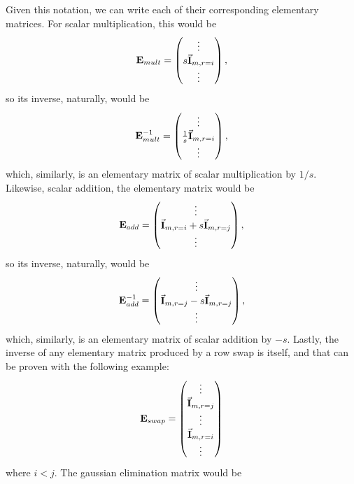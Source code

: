 \documentclass[12pt]{article}
\newcommand{\mat}[1]{\mathbf{#1}}
\begin{document}
Given this notation, we can write each of their corresponding elementary matrices. For scalar multiplication, this would be
\begin{equation*}
\mat{E}_{mult} = \begin{pmatrix}
  \vdots \\
  s\va{I}_{m,r=i}\\
  \vdots
\end{pmatrix},
\end{equation*}
so its inverse, naturally, would be
\begin{equation*}
\mat{E}_{mult}^{-1} = \begin{pmatrix}
  \vdots \\
  \frac{1}{s}\va{I}_{m,r=i}\\
  \vdots
\end{pmatrix},
\end{equation*}
which, similarly, is an elementary matrix of scalar multiplication by $1/s$. Likewise, scalar addition, the elementary matrix would be
\begin{equation*}
\mat{E}_{add} = \begin{pmatrix}
  \vdots \\
  \va{I}_{m,r=i} + s\va{I}_{m,r=j} \\
  \vdots
\end{pmatrix},
\end{equation*}
so its inverse, naturally, would be
\begin{equation*}
\mat{E}_{add}^{-1} = \begin{pmatrix}
  \vdots \\
  \va{I}_{m,r=j} - s\va{I}_{m,r=j} \\
  \vdots
\end{pmatrix},
\end{equation*}
which, similarly, is an elementary matrix of scalar addition by $-s$. Lastly, the inverse of any elementary matrix produced by a row swap is itself, and that can be proven with the following example:
\begin{equation*}
\mat{E}_{swap} = \begin{pmatrix}
\vdots \\
\va{I}_{m,r=j} \\
\vdots \\
\va{I}_{m,r=i} \\
\vdots
\end{pmatrix}
\end{equation*} 
where $i<j$. The gaussian elimination matrix would be
\end{document}
